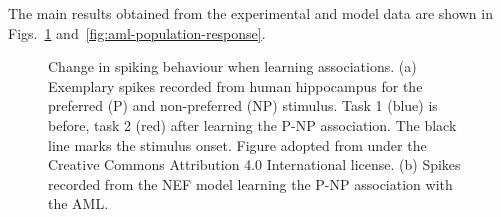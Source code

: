 The main results obtained from the experimental and model data are shown in Figs.~\ref{fig:aml-spikes} and~\ref{fig:aml-population-response}.
\begin{figure}
    \centering

    \vspace*{0.34cm}
    \caption[Change in spiking behaviour when learning associations.]{Change in spiking behaviour when learning associations. (a) Exemplary spikes recorded from human hippocampus for the preferred (P) and non-preferred (NP) stimulus. Task 1 (blue) is before, task 2 (red) after learning the P-NP association. The black line marks the stimulus onset. Figure adopted from \textcite{ison2015} under the Creative Commons Attribution 4.0 International license. (b) Spikes recorded from the NEF model learning the P-NP association with the AML\@.}\label{fig:aml-spikes}
\end{figure}
